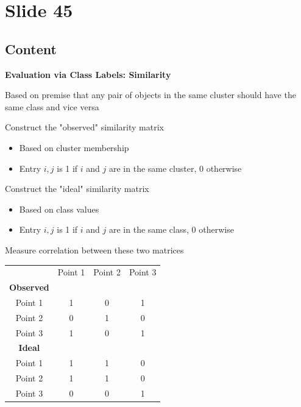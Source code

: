 \documentclass{article}%
\begin{document}
%
\newpage%
\section{Slide 45}%
\label{sec:Slide45}%
\subsection{Content}%

\textbf{Evaluation via Class Labels: Similarity}

Based on premise that any pair of objects in the same
cluster should have the same class and vice versa

Construct the "observed" similarity matrix

\begin{itemize}
    \item Based on cluster membership
    \item Entry $i, j$ is 1 if $i$ and $j$ are in the same cluster, 0 otherwise
\end{itemize}

Construct the "ideal" similarity matrix

\begin{itemize}
    \item Based on class values
    \item Entry $i, j$ is 1 if $i$ and $j$ are in the same class, 0 otherwise
\end{itemize}

Measure correlation between these two matrices

\begin{tabular}{cccc}
& Point 1 & Point 2 & Point 3 \\
\textbf{Observed} & & & \\
Point 1 & 1 & 0 & 1 \\
Point 2 & 0 & 1 & 0 \\
Point 3 & 1 & 0 & 1 \\
\textbf{Ideal} & & & \\
Point 1 & 1 & 1 & 0 \\
Point 2 & 1 & 1 & 0 \\
Point 3 & 0 & 0 & 1 \\
\end{tabular}
%
\end{document}
